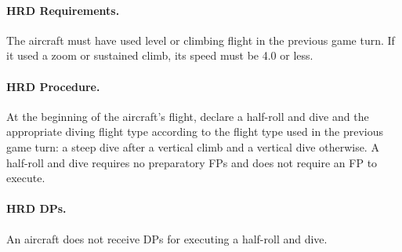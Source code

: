 {\paragraph{HRD Requirements.} The aircraft must have used level or climbing flight in the previous game turn. If it used a zoom or sustained climb, its speed must be 4.0 or less.

\paragraph{HRD Procedure.} At the beginning of the aircraft's flight, declare a half-roll and dive and the appropriate diving flight type according to the flight type used in the previous game turn: a steep dive after a vertical climb and a vertical dive otherwise. A half-roll and dive requires no preparatory FPs and does not require an FP to execute.

\paragraph{HRD DPs.} An aircraft does not receive DPs for executing a half-roll and dive.
    
}

